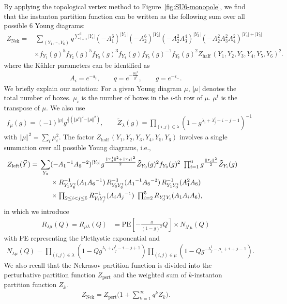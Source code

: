 \documentclass[letterpaper, 11pt]{article}
\newcommand{\nn}{\nonumber}
\begin{document}
By applying the topological vertex method to Figure~\ref{fig:SU6-monopole}, we find that the instanton partition function can be  written as the following sum over all possible 6 Young diagrams:
\begin{align}
  \label{eq:znek-su6}
  Z_{\text{Nek}} 
  =&\, \sum_{(Y_1, \cdots, Y_6)}q^{\sum_{i=1}^6|Y_i|} (-A_1^6)^{|Y_1|}(-A_2^6)^{|Y_2|}(-A_2^2A_3^4)^{|Y_3|}(-A_2^2A_3^2A_4^2)^{|Y_4| + |Y_5|}\nn\\
  &\times f_{Y_1}(g)^5f_{Y_2}(g)^5f_{Y_3}(g)^3f_{Y_4}(g)f_{Y_5}(g)^{-1}f_{Y_6}(g)^{2}Z_{\text{half}}\,(Y_1, Y_2, Y_3, Y_4, Y_5, Y_6)^2. 
  \end{align}
  where the K\"ahler parameters can be identified as 
\begin{align}
A_i = e^{-a_i}, \qquad q = e^{-\frac{8\pi^2}{g^2}}, \qquad g=e^{-\epsilon_-}.
\end{align}
We briefly explain our notation: For a given Young diagram $\mu$, $|\mu|$ denotes the total number of boxes. $\mu_i$ is the number of boxes in the $i$-th row of $\mu$. $\mu^t$ is the transpose of $\mu$. We also use
\begin{align}
f_\mu(g) = (-1)^{|\mu|}g^{\frac{1}{2}({\Vert \mu^t\Vert ^2 - \Vert \mu\Vert ^2})}, \qquad \tilde{Z}_{\lambda}(g) 
= \prod_{(i,j) \in \lambda} {(1 - g^{\lambda_i + \lambda^t_j - i - j +1} )^{-1}}
\end{align}
with $\Vert \mu \Vert^2   = \sum_{i} \mu_i^2$. The factor $Z_{\text{half}}\,(Y_1, Y_2, Y_3, Y_4, Y_5, Y_6)$ involves a single summation over all possible Young diagrams, i.e.,
\begin{align}
Z_{\text{left}}(\vec{Y})= \,
\sum_{Y_0} &( - A_1{}^{-1} A_6{}^{-2})^{|Y_0|} 
g^{\frac{\Vert Y_0^t\Vert ^2+\Vert Y_0\Vert ^2}{2}} \tilde{Z}_{Y_0}(g)^2 f_{Y_0}(g)^2
\ \textstyle\prod_{i=1}^6 g^{\frac{\Vert Y_i\Vert ^2}{2}} \tilde{Z}_{Y_i} (g)
\cr 
& 
\times 
R_{Y_1 Y_6^t}^{-1} (A_1 A_6{}^{-1})\,R_{Y_0 Y_6^t}^{-1} (A_1{}^{-1} A_6{}^{-2})\,R_{Y_1Y_0^t }^{-1} (A_1^2A_6) \cr 
& 
\times  
 \textstyle\prod_{2 \le i <  j \le 5} R_{Y_i Y_j^t}^{-1} (A_i A_j{}^{-1})\ 
 \prod_{i=2}^5 R_{Y_0^t Y_i} (A_1 A_i  A_6) ,
\end{align}
in which we introduce
\begin{align}
R_{\lambda \mu} (Q)=R_{ \mu\lambda} (Q)
&= \text{PE} \left[ - \frac{g}{(1-g)^2} Q \right]
\times N_{\lambda^t \mu} (Q)
\end{align}
with PE representing the Plethystic exponential
 and 
\begin{align}
N_{\lambda \mu} (Q) 
= \prod_{(i,j) \in \lambda} \left( 1 - Q g^{\lambda_i + \mu_j^t -i-j+1} \right)
\prod_{(i,j) \in \mu} \left( 1 - Q g^{-\lambda^t_j - \mu_i + i + j - 1} \right).
\end{align}
We also recall that the Nekrasov partition function is divided into the perturbative partition function $Z_{\text{pert}}$ and the weighted sum of $k$-instanton partition function $Z_k$.
\begin{align}
Z_{\text{Nek}} = Z_{\text{pert}}\Big(1 + \sum_{k=1}^{\infty}q^kZ_k\Big).
\end{align}
\end{document}
